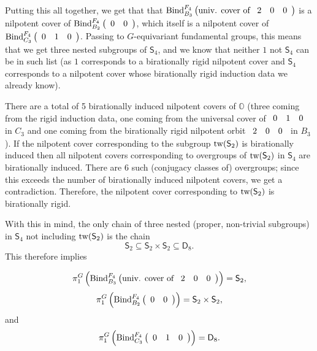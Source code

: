 \documentclass[11pt]{amsart}
\renewcommand{\O}{{\mathbb O}}
\newcommand{\Dih}{{\mathsf{D}}}
\newcommand{\Sym}{{\mathsf{S}}}
\newcommand{\tw}{{{\mbox{\rm tw}}}}
\newcommand{\BInd}{{{\mbox{\rm Bind}}}}
\numberwithin{equation}{section}
\begin{document}
	Putting this all together, we get that that $\BInd_{B_3}^{F_4}\left(\mbox{univ. cover of } \begin{array}{c c c}
		2 & 0 & 0\\
	\end{array}\right)$ is a nilpotent cover of $\BInd_{B_2}^{F_4}\left(\begin{array}{c c}
		0 & 0\\
	\end{array}\right)$, which itself is a nilpotent cover of $\BInd_{C_3}^{F_4}\left(\begin{array}{c c c}
		0 & 1 & 0 \\
	\end{array}\right)$. Passing to $G$-equivariant fundamental groups, this means that we get three nested subgroups of $\Sym_4$, and we know that neither $1$ not $\Sym_4$ can be in such list (as $1$ corresponds to a birationally rigid nilpotent cover and $\Sym_4$ corresponds to a nilpotent cover whose birationally rigid induction data we already know).
	
	There are a total of 5 birationally induced nilpotent covers of $\O$ (three coming from the rigid induction data, one coming from the universal cover of $\begin{array}{c c c}
		0 & 1 & 0 \\
	\end{array}$ in $C_3$ and one coming from the birationally rigid nilpotent orbit $\begin{array}{c c c}
		2 & 0 & 0  \\
	\end{array}$ in $B_3$). If the nilpotent cover corresponding to the subgroup $\tw(\Sym_2)$ is birationally induced then all nilpotent covers corresponding to overgroups of $\tw(\Sym_2)$ in $\Sym_4$ are birationally induced. There are 6 such (conjugacy classes of) overgroups; since this exceeds the number of birationally induced nilpotent covers, we get a contradiction. Therefore, the nilpotent cover corresponding to $\tw(\Sym_2)$ is birationally rigid.
	
	With this in mind, the only chain of three nested (proper, non-trivial subgroups) in $\Sym_4$ not including $\tw(\Sym_2)$ is the chain $$\Sym_2\subseteq \Sym_2\times\Sym_2 \subseteq \Dih_8.$$ This therefore implies 
	
	$$\pi_1^G\left(\BInd_{B_3}^{F_4}\left(\mbox{univ. cover of } \begin{array}{c c c}
		2 & 0 & 0 \\
	\end{array}\right)\right)=\Sym_2,$$ $$\pi_1^G\left(\BInd_{B_2}^{F_4}\left(\begin{array}{c c}
		0 & 0 \\
	\end{array}\right)\right)=\Sym_2\times\Sym_2,$$ and $$\pi_1^G\left(\BInd_{C_3}^{F_4}\left(\begin{array}{c c c}
		0 & 1 & 0 \\
	\end{array}\right)\right)=\Dih_8.$$
	
\end{document}
